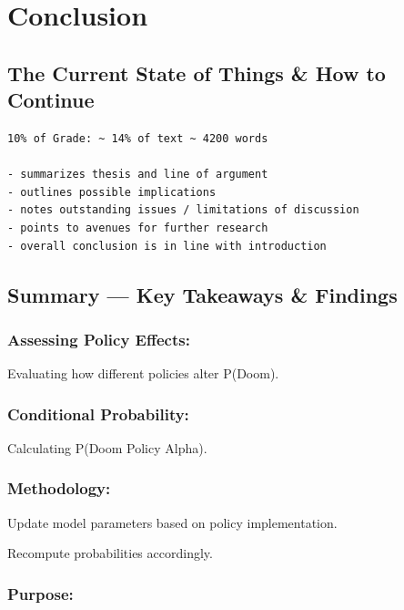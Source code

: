 \documentclass[
  letterpaper,
]{book}
\begin{document}

\chapter{Conclusion}\label{conclusion}

\section{The Current State of Things \& How to
Continue}\label{the-current-state-of-things-how-to-continue}

\begin{verbatim}
10% of Grade: ~ 14% of text ~ 4200 words

- summarizes thesis and line of argument 
- outlines possible implications
- notes outstanding issues / limitations of discussion
- points to avenues for further research
- overall conclusion is in line with introduction
\end{verbatim}

\section{Summary --- Key Takeaways \&
Findings}\label{summary-key-takeaways-findings}

\subsection{Assessing Policy Effects:}\label{assessing-policy-effects}

Evaluating how different policies alter P(Doom).

\subsection{Conditional Probability:}\label{conditional-probability}

Calculating P(Doom \textbar{} Policy Alpha).

\subsection{Methodology:}\label{methodology-1}

Update model parameters based on policy implementation.

Recompute probabilities accordingly.

\subsection{Purpose:}\label{purpose}
\end{document}

